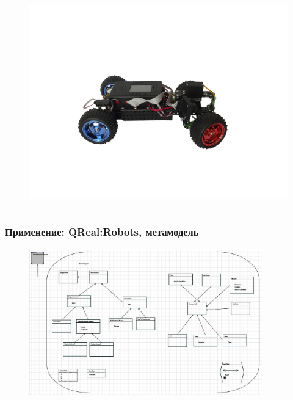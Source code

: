\documentclass[14pt]{beamer}
\begin{document}
\begin{frame}
\begin{columns}[onlytextwidth]
\begin{column}{0.3\textwidth}
\begin{figure}
\begin{center}
             		\hspace*{0.5cm}\includegraphics[width=\textwidth]{images/presentation/trik2.png}
            	\end{center}
            \end{figure}
        \end{column}
    \end{columns}
\end{frame}

\begin{frame}
    \frametitle{Применение: QReal:Robots, метамодель}
    \begin{figure}
        \begin{center}
        	\includegraphics[width=0.9\textwidth]{images/presentation/robotsMetamodel.png}
        \end{center}
    \end{figure}
\end{frame}
\end{document}
